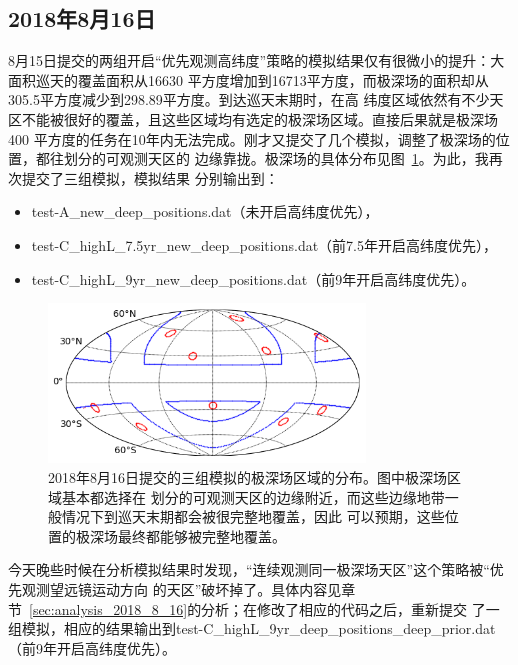 \documentclass[a4paper,11pt]{ctexart}
\def\blankpage{%
      \clearpage%
      \thispagestyle{empty}%
      \addtocounter{page}{-1}%
      \null%
      \clearpage}
\begin{document}
\subsection{2018年8月16日} \label{sec:result_2018_8_16}
8月15日提交的两组开启“优先观测高纬度”策略的模拟结果仅有很微小的提升：大面积巡天的覆盖面积从16630
平方度增加到16713平方度，而极深场的面积却从305.5平方度减少到298.89平方度。到达巡天末期时，在高
纬度区域依然有不少天区不能被很好的覆盖，且这些区域均有选定的极深场区域。直接后果就是极深场400
平方度的任务在10年内无法完成。刚才又提交了几个模拟，调整了极深场的位置，都往划分的可观测天区的
边缘靠拢。极深场的具体分布见图~\ref{fig:dist_deep_0816}。为此，我再次提交了三组模拟，模拟结果
分别输出到：
\begin{itemize}
\item test-A\_new\_deep\_positions.dat（未开启高纬度优先）， 
\item test-C\_highL\_7.5yr\_new\_deep\_positions.dat（前7.5年开启高纬度优先），
\item test-C\_highL\_9yr\_new\_deep\_positions.dat（前9年开启高纬度优先）。
\end{itemize}

\begin{figure}[h!]
\centering
\includegraphics[width=0.75\textwidth]{figures/dist_deep_0816.png}
\caption{2018年8月16日提交的三组模拟的极深场区域的分布。图中极深场区域基本都选择在
划分的可观测天区的边缘附近，而这些边缘地带一般情况下到巡天末期都会被很完整地覆盖，因此
可以预期，这些位置的极深场最终都能够被完整地覆盖。}
\label{fig:dist_deep_0816}
\end{figure}

{\heiti 今天晚些时候在分析模拟结果时发现，“连续观测同一极深场天区”这个策略被“优先观测望远镜运动方向
的天区”破坏掉了。具体内容见章节~\ref{sec:analysis_2018_8_16}的分析；在修改了相应的代码之后，重新提交
了一组模拟，相应的结果输出到test-C\_highL\_9yr\_deep\_positions\_deep\_prior.dat（前9年开启高纬度优先）。}

\blankpage
\end{document}
